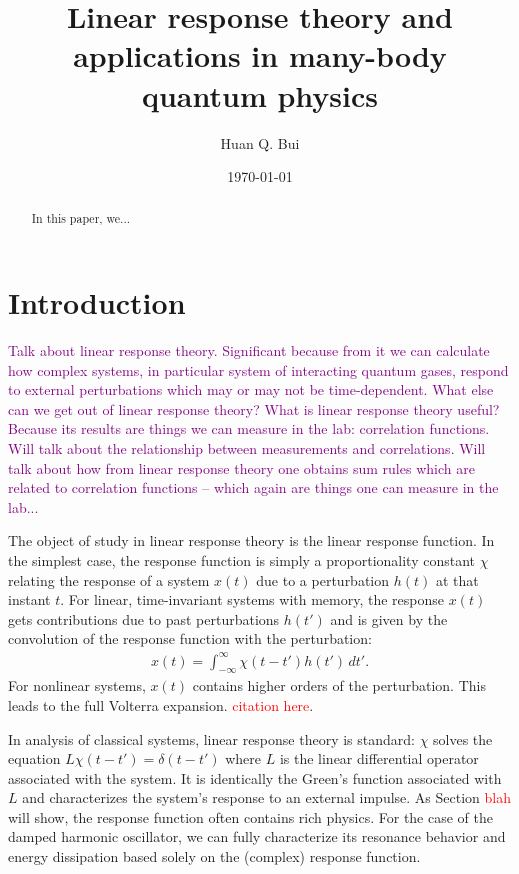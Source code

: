 \documentclass[reprint,
nofootinbib,
amsmath,amssymb,
aps]{revtex4-1}
\begin{document}
	
	

\title{Linear response theory and applications in many-body quantum physics}
\author{Huan Q. Bui}
\date{\today}


\begin{abstract}
	In this paper, we...
\end{abstract}

\maketitle


\section{Introduction}
\textcolor{purple}{Talk about linear response theory. Significant because from it we can calculate how complex systems, in particular system of interacting quantum gases, respond to external perturbations which may or may not be time-dependent. What else can we get out of linear response theory? What is linear response theory useful? Because its results are things we can measure in the lab: correlation functions. Will talk about the relationship between measurements and correlations. Will talk about how from linear response theory one obtains sum rules which are related to correlation functions -- which again are things one can measure in the lab... }

The object of study in linear response theory is the linear response function. In the simplest case, the response function is simply a proportionality constant $\chi$ relating the response of a system $x(t)$ due to a perturbation $h(t)$ at that instant $t$. For linear, time-invariant systems with memory, the response $x(t)$ gets contributions due to past perturbations $h(t')$ and is given by the convolution of the response function with the perturbation:
\begin{align}\label{eq:linear_response}
x(t) = \int_{-\infty}^{\infty} \chi(t-t') h(t') \,dt'.
\end{align}
For nonlinear systems, $x(t)$ contains higher orders of the perturbation. This leads to the full Volterra expansion. \textcolor{red}{citation here}. 

In analysis of classical systems, linear response theory is standard: $\chi$ solves the equation $ L \chi(t-t') = \delta(t-t')$ where $L$ is the linear differential operator associated with the system. It is identically the Green's function associated with $L$ and characterizes the system's response to an external impulse. As Section \textcolor{red}{blah} will show, the response function often contains rich physics. For the case of the damped harmonic oscillator, we can fully characterize its resonance behavior and energy dissipation based solely on the (complex) response function. 
\end{document}
